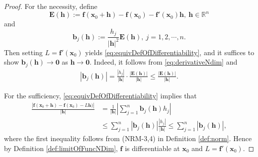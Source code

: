 \begin{proof}
  For the necessity, define
  \begin{displaymath}
    \mathbf{E}(\mathbf{h}):=\mathbf{f}(\mathbf{x}_{0}+\mathbf{h})
    -\mathbf{f}(\mathbf{x}_{0})-\mathbf{f}'(\mathbf{x}_{0})\mathbf{h},
    \ \mathbf{h}\in \mathbb{R}^{n}
  \end{displaymath}
  and
  \begin{displaymath}
    \mathbf{b}_{j}(\mathbf{h})
    :=\frac{h_{j}}{|\mathbf{h}|^{2}}\mathbf{E}(\mathbf{h}),\
    j=1,2,\cdots,n.
  \end{displaymath}
  Then setting $L=\mathbf{f}'(\mathbf{x}_{0})$ yields
  \eqref{eq:equivDefOfDifferentiability}, and
  it suffices to show
  $\mathbf{b}_{j}(\mathbf{h})\rightarrow \mathbf{0}$ as
  $\mathbf{h}\rightarrow \mathbf{0}$. Indeed, it follows from
  \eqref{eq:derivativeNdim} and
  \begin{align*}
    |\mathbf{b}_{j}(\mathbf{h})|=\frac{|h_{j}|}{|\mathbf{h}|}
    \cdot \frac{|\mathbf{E}(\mathbf{h})|}{|\mathbf{h}|}
    \le \frac{|\mathbf{E}(\mathbf{h})|}{|\mathbf{h}|}.
  \end{align*}

  For the sufficiency, \eqref{eq:equivDefOfDifferentiability} implies
  that
  \begin{align*}
    \frac{|\mathbf{f}(\mathbf{x}_{0}+\mathbf{h})
    -\mathbf{f}(\mathbf{x}_{0})-L\mathbf{h})|}{|\mathbf{h}|}
    &=\frac{1}{|\mathbf{h}|}
    \left|\sum_{j=1}^{n}\mathbf{b}_{j}(\mathbf{h})h_{j}\right|\\
    &\le  \sum_{j=1}^{n}|\mathbf{b}_{j}(\mathbf{h})|
      \frac{|h_{j}|}{|\mathbf{h}|}
     \le \sum_{j=1}^{n}|\mathbf{b}_{j}(\mathbf{h})|,
  \end{align*}
  where the first inequality follows from
  (NRM-3,4) in Definition \ref{def:norm}.
  Hence by Definition \ref{def:limitOfFuncNDim},
  $\mathbf{f}$ is differentiable at $\mathbf{x}_{0}$ and
  $L=\mathbf{f}'(\mathbf{x}_{0})$.
\end{proof}

